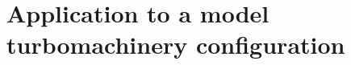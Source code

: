 
\chapter{Application to a model turbomachinery configuration}
\label{cha:limitations_convergence}

\chabstract{}


\newpage


